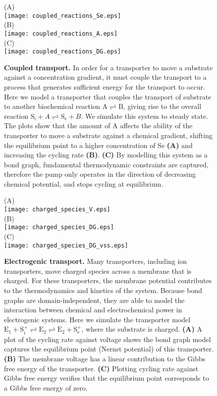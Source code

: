 \documentclass[11pt]{article}
\begin{document}
\begin{figure}
	\centering
	(A)\\
	\texttt{[image: coupled\_reactions\_Se.eps]}\\
	(B)\\
	\texttt{[image: coupled\_reactions\_A.eps]}\\
	(C)\\
	\texttt{[image: coupled\_reactions\_DG.eps]}
	\caption{\textbf{Coupled transport.} In order for a transporter to move a substrate against a concentration gradient, it must couple the transport to a process that generates sufficient energy for the transport to occur. Here we model a transporter that couples the transport of substrate to another biochemical reaction $\mathrm{A \rightleftharpoons B}$, giving rise to the overall reaction $	\mathrm{S_i} + A \rightleftharpoons \mathrm{S_e} + B$. We simulate this system to steady state. The plots show that the amount of A affects the ability of the transporter to move a substrate against a chemical gradient, shifting the equilibrium point to a higher concentration of Se \textbf{(A)} and increasing the cycling rate \textbf{(B)}. \textbf{(C)} By modelling this system as a bond graph, fundamental thermodynamic constraints are captured, therefore the pump only operates in the direction of decreasing chemical potential, and stops cycling at equilibrium.}
\end{figure}

\begin{figure}
	\centering
	(A)\\
	\texttt{[image: charged\_species\_V.eps]}\\
	(B)\\
	\texttt{[image: charged\_species\_DG.eps]} \\
	(C)\\
	\texttt{[image: charged\_species\_DG\_vss.eps]}
	\caption{\textbf{Electrogenic transport.} Many transporters, including ion transporters, move charged species across a membrane that is charged. For these transporters, the membrane potential contributes to the thermodynamics and kinetics of the system. Because bond graphs are domain-independent, they are able to model the interaction between chemical and electrochemical power in electrogenic systems. Here we simulate the transporter model $\mathrm{E_1 + S_i^+ \rightleftharpoons E_2 \rightleftharpoons E_2 + S_e^+}$, where the substrate is charged. \textbf{(A)} A plot of the cycling rate against voltage shows the bond graph model captures the equilibrium point (Nernst potential) of this transporter. \textbf{(B)} The membrane voltage has a linear contribution to the Gibbs free energy of the transporter. \textbf{(C)} Plotting cycling rate against Gibbs free energy verifies that the equilibrium point corresponds to a Gibbs free energy of zero.}
\end{figure}
\end{document}
